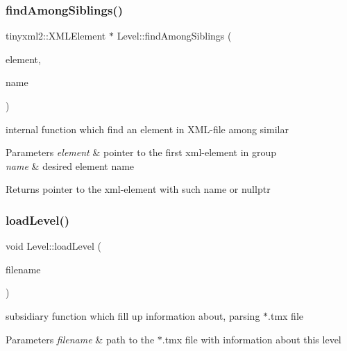 \subsubsection{\texorpdfstring{find\+Among\+Siblings()}{findAmongSiblings()}}
{\footnotesize\ttfamily tinyxml2\+::\+X\+M\+L\+Element $\ast$ Level\+::find\+Among\+Siblings (\begin{DoxyParamCaption}\item[{tinyxml2\+::\+X\+M\+L\+Element $\ast$}]{element,  }\item[{std\+::string}]{name }\end{DoxyParamCaption})\hspace{0.3cm}{\ttfamily [private]}}



internal function which find an element in X\+M\+L-\/file among similar 


\begin{DoxyParams}{Parameters}
{\em element} & pointer to the first xml-\/element in group \\
\hline
{\em name} & desired element name \\
\hline
\end{DoxyParams}
\begin{DoxyReturn}{Returns}
pointer to the xml-\/element with such name or nullptr 
\end{DoxyReturn}
\mbox{\label{class_level_a362e4dcf6ae7fdad3c186246b2b7c355}} 
\subsubsection{\texorpdfstring{load\+Level()}{loadLevel()}}
{\footnotesize\ttfamily void Level\+::load\+Level (\begin{DoxyParamCaption}\item[{std\+::string}]{filename }\end{DoxyParamCaption})\hspace{0.3cm}{\ttfamily [private]}}



subsidiary function which fill up information about, parsing $\ast$.tmx file 


\begin{DoxyParams}{Parameters}
{\em filename} & path to the $\ast$.tmx file with information about this level \\
\hline
\end{DoxyParams}

